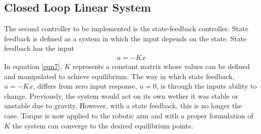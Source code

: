 \documentclass[12pt]{article}
\begin{document}
\subsection{Closed Loop Linear System}
The second controller to be implemented is the state-feedback controller. State feedback is defined as a system in which the input depends on the state. State feedback has the input
\begin{align}
\label{eqn7}
u = -Kx
\end{align}
In equation \ref{eqn7}, $K$ represents a constant matrix whose values can be defined and manipulated to achieve equilibrium. The way in which state feedback,$u=-Kx$, differs from zero input response, $u=0$, is through the inputs ability to change. Previously, the system would act on its own wether it was stable or unstable due to gravity. However, with a state feedback, this is no longer the case. Torque is now applied to the robotic arm and with a proper formulation of $K$ the system can converge to the desired equilibrium points. 
\end{document}
